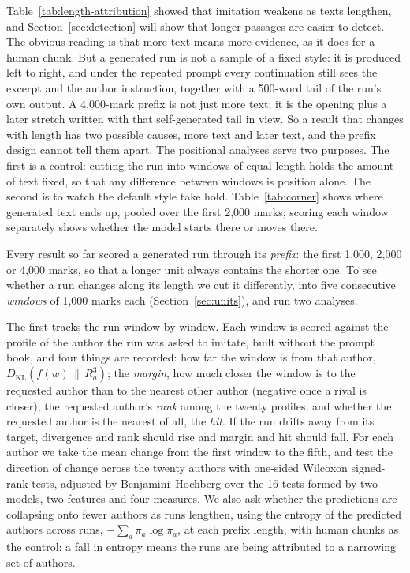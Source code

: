 \documentclass[11pt]{article}
\newcommand{\KL}{D_{\mathrm{KL}}}
\begin{document}
Table~\ref{tab:length-attribution} showed that imitation weakens as texts
lengthen, and Section~\ref{sec:detection} will show that longer passages
are easier to detect.  The obvious reading is that more text means more evidence,
as it does for a human chunk.  But a generated run is not a sample of a
fixed style: it is produced left to right, and under the repeated prompt
every continuation still sees the excerpt and the author instruction,
together with a 500-word tail of the run's own output.  A 4,000-mark
prefix is not just more text; it is the opening plus a later stretch
written with that self-generated tail in view.  So a result that changes
with length has two possible causes, more text and later text, and the
prefix design cannot tell them apart.  The positional analyses serve two
purposes.  The first is a control: cutting the run into windows of equal
length holds the amount of text fixed, so that any difference between
windows is position alone.  The second is to watch the default style
take hold.
Table~\ref{tab:corner} shows where generated text ends up, pooled over
the first 2,000 marks; scoring each window separately shows whether the
model starts there or moves there.

Every result so far scored a generated run through its \emph{prefix}: the
first 1,000, 2,000 or 4,000 marks, so that a longer unit always contains
the shorter one.  To see whether a run changes along its length we cut
it differently, into five consecutive \emph{windows} of 1,000 marks each
(Section~\ref{sec:units}), and run two analyses.

The first tracks the run window by window.  Each window is scored against
the profile of the author the run was asked to imitate, built without the
prompt book, and four things are recorded: how far the window is from
that author, \(\KL(f(w)\,\|\,R^3_a)\); the \emph{margin}, how much closer
the window is to the requested author than to the nearest other author
(negative once a rival is closer); the requested author's \emph{rank}
among the twenty profiles; and whether the requested author is the
nearest of all, the \emph{hit}.  If the run drifts away from its target,
divergence and rank should rise and margin and hit should fall.  For each
author we take the mean change from the first window to the fifth, and
test the direction of change across the twenty authors with one-sided
Wilcoxon signed-rank tests, adjusted by Benjamini--Hochberg
\cite{benjamini1995} over the 16 tests formed by two models, two features
and four measures.  We also ask whether the predictions are collapsing
onto fewer authors as runs lengthen, using the entropy of the predicted
authors across runs, \(-\sum_a \pi_a \log \pi_a\), at each prefix length,
with human chunks as the control: a fall in entropy means the runs are
being attributed to a narrowing set of authors.
\end{document}
